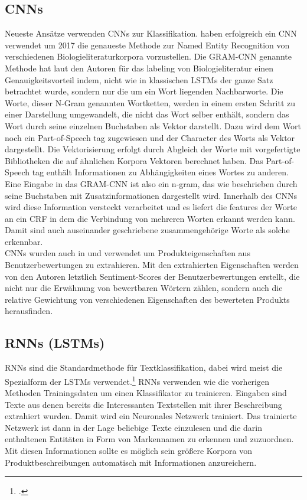 \documentclass[paper=a4,12pt,listof=totoc]{scrartcl}%
\begin{document}
	\subsection{CNNs}
	Neueste Ansätze verwenden CNNs zur Klassifikation. \cite{Zhu.2018} haben erfolgreich ein CNN verwendet um 2017 die genaueste Methode zur Named Entity Recognition von verschiedenen Biologieliteraturkorpora vorzustellen. Die GRAM-CNN genannte Methode hat laut den Autoren für das labeling von Biologieliteratur einen Genauigkeitsvorteil indem, nicht wie in klassischen LSTMs der ganze Satz betrachtet wurde, sondern nur die um ein Wort liegenden Nachbarworte. Die Worte, dieser N-Gram genannten Wortketten, werden in einem ersten Schritt zu einer Darstellung umgewandelt, die nicht das Wort selber enthält, sondern das Wort durch seine einzelnen Buchstaben als Vektor darstellt. Dazu wird dem Wort noch ein Part-of-Speech tag zugewiesen und der Character des Worts als Vektor dargestellt. 
	Die Vektorisierung erfolgt durch Abgleich der Worte mit vorgefertigte Bibliotheken die auf ähnlichen Korpora Vektoren berechnet haben. Das Part-of-Speech tag enthält Informationen zu Abhängigkeiten eines Wortes zu anderen. Eine Eingabe in das GRAM-CNN ist also ein n-gram, das wie beschrieben durch seine Buchstaben mit Zusatzinformationen dargestellt wird.
	Innerhalb des CNNs wird diese Information versteckt verarbeitet und es liefert die features der Worte an ein CRF in dem die Verbindung von mehreren Worten erkannt werden kann. Damit sind auch auseinander geschriebene zusammengehörige Worte als solche erkennbar.\\
	CNNs wurden auch in \cite{Lee.2019} und \cite{Lee.2020} verwendet um Produkteigenschaften aus Benutzerbewertungen zu extrahieren. Mit den extrahierten Eigenschaften werden von den Autoren letztlich Sentiment-Scores der Benutzerbewertungen erstellt, die nicht nur die Erwähnung von bewertbaren Wörtern zählen, sondern auch die relative Gewichtung von verschiedenen Eigenschaften des bewerteten Produkts herausfinden.\\
	\subsection{RNNs (LSTMs)}
	RNNs sind die Standardmethode für Textklassifikation, dabei wird meist die Spezialform der LSTMs verwendet.\footcite{Majumder.30.03.2018}
	RNNs verwenden wie die vorherigen Methoden Trainingsdaten um einen Klassifikator zu trainieren. Eingaben sind Texte aus denen bereits die Interessanten Textstellen mit ihrer Beschreibung extrahiert wurden. Damit wird ein Neuronales Netzwerk trainiert.
	Das trainierte Netzwerk ist dann in der Lage beliebige Texte einzulesen und die darin enthaltenen Entitäten in Form von Markennamen zu erkennen und zuzuordnen. Mit diesen Informationen sollte es möglich sein größere Korpora von Produktbeschreibungen automatisch mit Informationen anzureichern.
\end{document}
